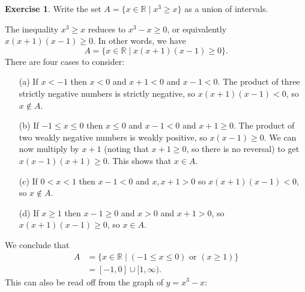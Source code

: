 \documentclass[a4paper]{book}
\newcommand{\R}         {{\mathbb{R}}}
\newcommand{\st}        {\;|\;}
\renewcommand{\:}{\colon}
\theoremstyle{definition}
\newtheorem{exercise}[theorem]{Exercise}
\renewenvironment{solution}{\SolutionInline}{\endSolutionInline}
\begin{document}
\begin{exercise}
 Write the set $A=\{x\in\R\st x^3\geq x\}$ as a union of intervals.
\end{exercise}
\begin{solution}
 The inequality $x^3\geq x$ reduces to $x^3-x\geq 0$, or equivalently
 $x(x+1)(x-1)\geq 0$.  In other words, we have 
 \[ A = \{x\in\R\st x(x+1)(x-1)\geq 0\}. \]
 There are four cases to consider:
 \begin{itemize}
  \item[(a)] If $x<-1$ then $x<0$ and $x+1<0$ and $x-1<0$.  The
   product of three strictly negative numbers is strictly negative, so
   $x(x+1)(x-1)<0$, so $x\not\in A$.
  \item[(b)] If $-1\leq x\leq 0$ then $x\leq 0$ and $x-1<0$ and
   $x+1\geq 0$.  The product of two weakly negative numbers is weakly
   positive, so $x(x-1)\geq 0$.  We can now multiply by $x+1$ (noting
   that $x+1\geq 0$, so there is no reversal) to get
   $x(x-1)(x+1)\geq 0$.  This shows that $x\in A$.
  \item[(c)] If $0<x<1$ then $x-1<0$ and $x,x+1>0$ so $x(x+1)(x-1)<0$,
   so $x\not\in A$.
  \item[(d)] If $x\geq 1$ then $x-1\geq 0$ and $x>0$ and $x+1>0$, so
   $x(x+1)(x-1)\geq 0$, so $x\in A$.
 \end{itemize}
 We conclude that
 \begin{align*}
  A &= \{x\in\R\st (-1\leq x\leq 0) \text{ or } (x\geq 1) \} \\
    &= [-1,0] \cup [1,\infty). 
 \end{align*}
 This can also be read off from the graph of $y=x^3-x$:
 \begin{center}
 \end{center}
\end{solution}
\end{document}

